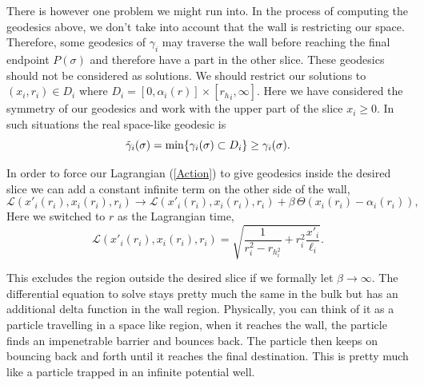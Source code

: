 There is however one problem we might run into. In the process of computing the geodesics above, we don't take into account that the wall is restricting our space. Therefore, some geodesics of $\gamma_i$ may traverse the wall before reaching the final endpoint $P(\sigma)$ and therefore have a part in the other slice. These geodesics should not be considered as solutions. We should restrict our solutions to $(x_i,r_i)\in D_i$ where $D_i=[0,\alpha_i(r)]\times[{r_h}_i,\infty]$. Here we have considered the symmetry of our geodesics and work with the upper part of the slice $x_i\geq0$. In such situations the real space-like geodesic is
\begin{equation}
    \Tilde{\gamma}_i(\sigma) = \min\{\gamma_i(\sigma)\subset D_i\} \geq \gamma_i(\sigma).
\end{equation}

In order to force our Lagrangian (\ref{Action}) to give geodesics inside the desired slice we can add a constant infinite term on the other side of the wall,
\begin{equation}
    \mathcal{L}\left({x'}_i(r_i),x_i(r_i),r_i\right) \to \mathcal{L}\left({x'}_i(r_i),x_i(r_i),r_i\right) + \beta\,\Theta\left( x_i(r_i) - \alpha_i(r_i)\right),
\end{equation}
Here we switched to $r$ as the Lagrangian time,
\begin{equation}
    \mathcal{L}\left({x'}_i(r_i),x_i(r_i),r_i\right) = \sqrt{\frac{1}{r_i^2-r_h_i^2}+r_i^2\frac{{x'}_i}{\ell_i}}.
\end{equation}

This excludes the region outside the desired slice if we formally let $\beta \to \infty$. The differential equation to solve stays pretty much the same in the bulk but has an additional delta function in the wall region. Physically, you can think of it as a particle travelling in a space like region, when it reaches the wall, the particle finds an impenetrable barrier and bounces back. The particle then keeps on bouncing back and forth until it reaches the final destination. This is pretty much like a particle trapped in an infinite potential well.

